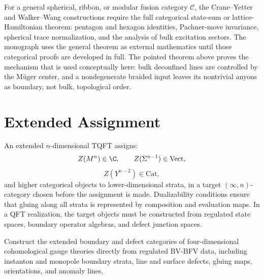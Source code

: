 \begin{remark}
\label{rem:crane-yetter-walker-wang-general-status}
For a general spherical, ribbon, or modular fusion category \(\mathcal C\),
the Crane--Yetter and Walker--Wang constructions require the full categorical
state-sum or lattice-Hamiltonian theorem: pentagon and hexagon identities,
Pachner-move invariance, spherical trace normalization, and the analysis of
bulk excitation sectors.  The monograph uses the general theorem as external
mathematics until those categorical proofs are developed in full.  The
pointed theorem above proves the mechanism that is used conceptually here:
bulk deconfined lines are controlled by the M\"uger center, and a nondegenerate
braided input leaves its nontrivial anyons as boundary, not bulk, topological
order.
\end{remark}

\section{Extended Assignment}

An extended \(n\)-dimensional TQFT assigns:
\[
  Z(M^n)\in\C,\qquad
  Z(\Sigma^{n-1})\in\mathrm{Vect},
\]
\[
  Z(Y^{n-2})\in\mathrm{Cat},
\]
and higher categorical objects to lower-dimensional strata, in a target
\((\infty,n)\)-category chosen before the assignment is made.  Dualizability
conditions ensure that gluing along all strata is represented by composition
and evaluation maps.  In a QFT realization, the target objects must be
constructed from regulated state spaces, boundary operator algebras, and
defect junction spaces.

\begin{openproblem}
\label{op:gauge-theoretic-extended-tqft-construction}
Construct the extended boundary and defect categories of four-dimensional
cohomological gauge theories directly from regulated BV-BFV data, including
instanton and monopole boundary strata, line and surface defects, gluing
maps, orientations, and anomaly lines.
\end{openproblem}
